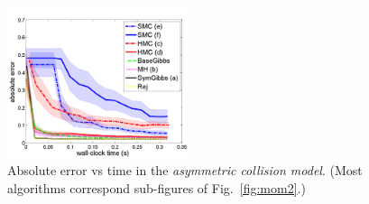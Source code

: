 \documentclass[]{article}
\begin{document}
\begin{figure}
\centering
     \includegraphics[width=0.8\linewidth, height=125pt]
{plotsx/vis-col/err-vs-time__param2-shaded.pdf}
      \caption{
Absolute error vs time in the \emph{asymmetric collision model}. (Most algorithms correspond sub-figures of Fig.~\ref{fig:mom2}.)
 }
\label{fig:asymmetric}
\end{figure}
\end{document}
